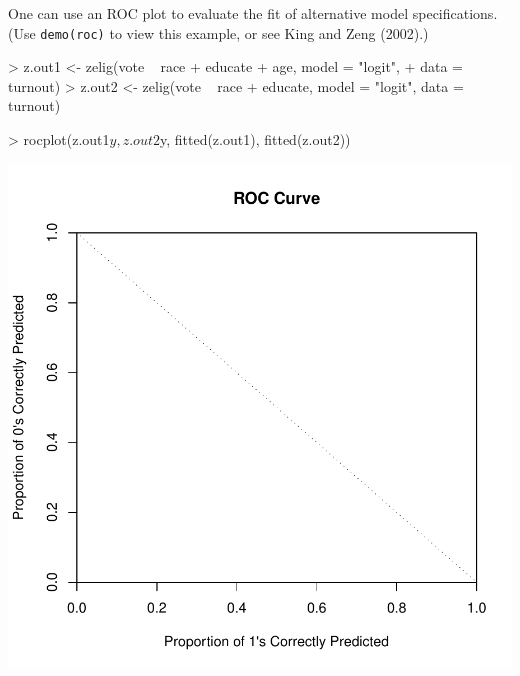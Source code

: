 \documentclass{article}
\begin{document}
\begin{enumerate}
  One can use an ROC plot to evaluate the fit of alternative model
  specifications.  (Use {\tt demo(roc)} to view this example, or see
  King and Zeng (2002)\nocite{KinZen02}.)  
\begin{Schunk}
\begin{Sinput}
> z.out1 <- zelig(vote ~ race + educate + age, model = "logit", 
+     data = turnout)
> z.out2 <- zelig(vote ~ race + educate, model = "logit", data = turnout)
\end{Sinput}
\end{Schunk}
\begin{center}
\begin{Schunk}
\begin{Sinput}
> rocplot(z.out1$y, z.out2$y, fitted(z.out1), fitted(z.out2))
\end{Sinput}
\end{Schunk}
\includegraphics{vigpics/logit-ROCPlot}
\end{center}
\end{enumerate}
\end{document}
